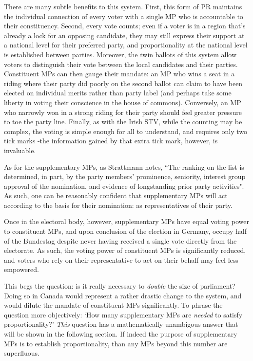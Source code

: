\documentclass[DIV=calc, paper=a4, fontsize=11pt, twocolumn]{scrartcl}	 %
\begin{document}
There are many subtle benefits to this system. 
First, this form of PR maintains the individual connection of every voter with a single MP who is accountable to their constituency.
Second, every vote counts; even if a voter is in a region that's already a lock for an opposing candidate, they may still express their support at a national level for their preferred party, and  proportionality at the national level is established between parties.
Moreover, the twin ballots of this system allow voters to distinguish their vote between the local candidates and their parties.  Constituent MPs can then gauge their mandate: an MP who wins a seat in a riding where their party did poorly on the second ballot can claim to have been elected on individual merits rather than party label (and perhaps take some liberty in voting their conscience in the house of commons). Conversely, an MP who narrowly won in a strong riding for their party should feel greater pressure to toe the party line.
Finally, as with the Irish STV, while the counting may be complex, the voting is simple enough for all to understand, and requires only two tick marks \--the information gained by that extra tick mark, however, is invaluable.

As for the supplementary MPs, as Strattmann notes\cite{Stratmann}, ``The ranking on the list is determined, in part, by the party members' prominence, seniority, interest group approval of the nomination, and evidence of longstanding prior party activities". 
As such, one can be reasonably confident that supplementary MPs will act according to the basis for their nomination: as representatives of their party.

Once in the electoral body, however, supplementary MPs have equal voting power to constituent MPs, and upon conclusion of the election in Germany, occupy half of the Bundestag despite never having received a single vote directly from the electorate. As such, the voting power of constituent MPs is significantly reduced, and voters who rely on their representative to act on their behalf may feel less empowered.

This begs the question: is it really necessary to \emph{double} the size of parliament? Doing so in Canada would represent a rather drastic change to the system, and would dilute the mandate of constituent MPs significantly. To phrase the question more objectively: `How many supplementary MPs are \emph{needed} to satisfy proportionality?' 
\emph{This} question has a mathematically unambigous answer that will be shown in the following section. If indeed the purpose of supplementary MPs is to establish proportionality, than any MPs beyond this number are superfluous.
\end{document}
